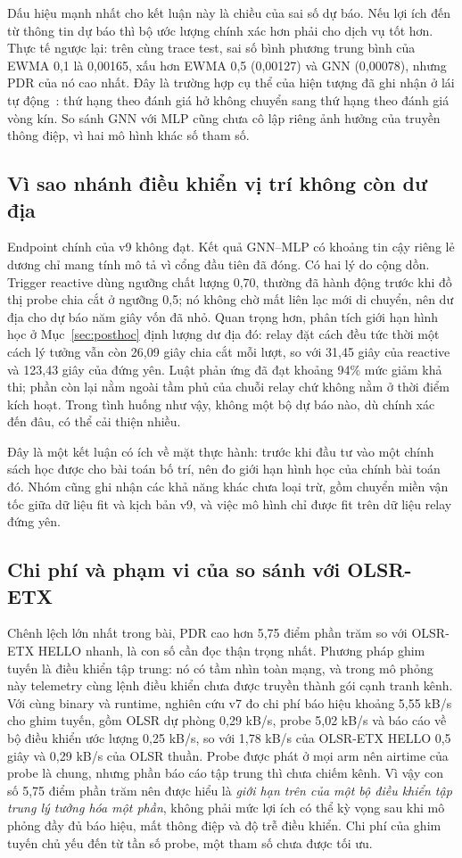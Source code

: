 \documentclass[11pt,a4paper]{article}
\begin{document}
Dấu hiệu mạnh nhất cho kết luận này là chiều của sai số dự báo. Nếu lợi ích đến
từ thông tin dự báo thì bộ ước lượng chính xác hơn phải cho dịch vụ tốt hơn.
Thực tế ngược lại: trên cùng trace test, sai số bình phương trung bình của EWMA
0,1 là 0,00165, xấu hơn EWMA 0,5 (0,00127) và GNN (0,00078), nhưng PDR của nó
cao nhất. Đây là trường hợp cụ thể của hiện tượng đã ghi nhận ở lái tự
động~\cite{closedloop2025}: thứ hạng theo đánh giá hở không chuyển sang thứ hạng
theo đánh giá vòng kín. So sánh GNN với MLP cũng chưa cô lập riêng ảnh hưởng của
truyền thông điệp, vì hai mô hình khác số tham số.

\subsection{Vì sao nhánh điều khiển vị trí không còn dư địa}
Endpoint chính của v9 không đạt. Kết quả GNN--MLP có khoảng tin cậy riêng lẻ
dương chỉ mang tính mô tả vì cổng đầu tiên đã đóng. Có hai lý do cộng dồn.
Trigger reactive dùng ngưỡng chất lượng 0,70, thường đã hành động trước khi đồ
thị probe chia cắt ở ngưỡng 0,5; nó không chờ mất liên lạc mới di chuyển, nên
dư địa cho dự báo năm giây vốn đã nhỏ. Quan trọng hơn, phân tích giới hạn hình
học ở Mục~\ref{sec:posthoc} định lượng dư địa đó: relay đặt cách đều tức thời
một cách lý tưởng vẫn còn 26,09 giây chia cắt mỗi lượt, so với 31,45 giây của
reactive và 123,43 giây của đứng yên. Luật phản ứng đã đạt khoảng 94\% mức giảm
khả thi; phần còn lại nằm ngoài tầm phủ của chuỗi relay chứ không nằm ở thời
điểm kích hoạt. Trong tình huống như vậy, không một bộ dự báo nào, dù chính xác
đến đâu, có thể cải thiện nhiều.

Đây là một kết luận có ích về mặt thực hành: trước khi đầu tư vào một chính
sách học được cho bài toán bố trí, nên đo giới hạn hình học của chính bài toán
đó. Nhóm cũng ghi nhận các khả năng khác chưa loại trừ, gồm chuyển miền vận tốc
giữa dữ liệu fit và kịch bản v9, và việc mô hình chỉ được fit trên dữ liệu
relay đứng yên.

\subsection{Chi phí và phạm vi của so sánh với OLSR-ETX}
Chênh lệch lớn nhất trong bài, PDR cao hơn 5,75 điểm phần trăm so với OLSR-ETX
HELLO nhanh, là con số cần đọc thận trọng nhất. Phương pháp ghim tuyến là điều
khiển tập trung: nó có tầm nhìn toàn mạng, và trong mô phỏng này telemetry cùng
lệnh điều khiển chưa được truyền thành gói cạnh tranh kênh. Với cùng binary và
runtime, nghiên cứu v7 đo chi phí báo hiệu khoảng 5,55 kB/s cho ghim tuyến,
gồm OLSR dự phòng 0,29 kB/s, probe 5,02 kB/s và báo cáo về bộ điều khiển ước
lượng 0,25 kB/s, so với 1,78 kB/s của OLSR-ETX HELLO 0,5 giây và 0,29 kB/s của
OLSR thuần. Probe được phát ở mọi arm nên airtime của probe là chung, nhưng
phần báo cáo tập trung thì chưa chiếm kênh. Vì vậy con số 5,75 điểm phần trăm
nên được hiểu là \emph{giới hạn trên của một bộ điều khiển tập trung lý tưởng
hóa một phần}, không phải mức lợi ích có thể kỳ vọng sau khi mô phỏng đầy đủ
báo hiệu, mất thông điệp và độ trễ điều khiển. Chi phí của ghim tuyến chủ yếu
đến từ tần số probe, một tham số chưa được tối ưu.
\end{document}

